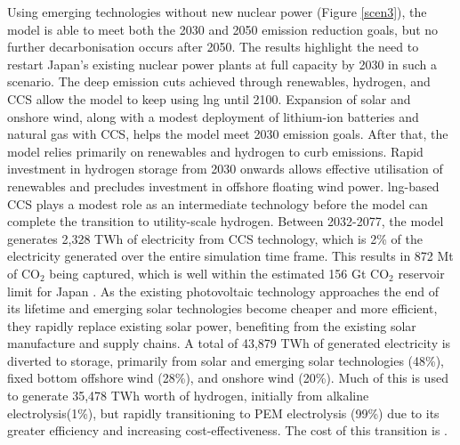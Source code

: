 Using emerging technologies without new nuclear power (Figure \ref{scen3}), the model is able to meet both the 2030 and 2050 emission reduction goals, but no further decarbonisation occurs after 2050. The results highlight the need to restart Japan's existing nuclear power plants at full capacity by 2030 in such a scenario. The deep emission cuts achieved through renewables, hydrogen, and \gls{CCS} allow the model to keep using \gls{lng} until 2100. Expansion of solar and onshore wind, along with a modest deployment of lithium-ion batteries and natural gas with \gls{CCS}, helps the model meet 2030 emission goals. After that, the model relies primarily on renewables and hydrogen to curb emissions. Rapid investment in hydrogen storage from 2030 onwards allows effective utilisation of renewables and precludes investment in offshore floating wind power. \gls{lng}-based \gls{CCS} plays a modest role as an intermediate technology before the model can complete the transition to utility-scale hydrogen. Between 2032-2077, the model generates 2,328 TWh  of electricity from \gls{CCS} technology, which is 2\% of the electricity generated over the entire simulation time frame. This results in 872 Mt of CO$_2$ being captured, which is well within the estimated 156 Gt CO$_2$ reservoir limit for Japan \cite{kato_energy_2016}. As the existing photovoltaic technology approaches the end of its lifetime and emerging solar technologies become cheaper and more efficient, they rapidly replace existing solar power, benefiting from the existing solar manufacture and supply chains. A total of 43,879 TWh of generated electricity is diverted to storage, primarily from solar and emerging solar technologies (48\%), fixed bottom offshore wind (28\%), and onshore wind (20\%). Much of this is used to generate 35,478 TWh worth of hydrogen, initially from alkaline electrolysis(1\%), but rapidly transitioning to PEM electrolysis (99\%) due to its greater efficiency and increasing cost-effectiveness. The cost of this transition is \DIFdelbegin \textbf{}%
\DIFdelend \DIFaddbegin {}\DIFaddend .

